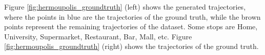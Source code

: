 \documentclass[12pt]{article}
\begin{document}

Figure \ref{fig:hermoupolis_groundtruth} (left) shows the generated trajectories, where the points in blue are the trajectories of the ground truth, while the brown points represent the remaining trajectories of the dataset. Some stops are Home, University, Supermarket, Restaurant, Bar, Mall, etc.
Figure \ref{fig:hermoupolis_groundtruth} (right) shows the trajectories of the ground truth.
\end{document}
